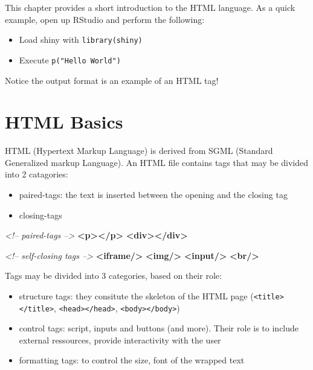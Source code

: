\documentclass[]{book}
\newenvironment{Shaded}{\begin{snugshade}}{\end{snugshade}}
\newcommand{\CommentTok}[1]{\textcolor[rgb]{0.56,0.35,0.01}{\textit{#1}}}
\newcommand{\KeywordTok}[1]{\textcolor[rgb]{0.13,0.29,0.53}{\textbf{#1}}}
\providecommand{\tightlist}{%
  \setlength{\itemsep}{0pt}\setlength{\parskip}{0pt}}
\begin{document}
This chapter provides a short introduction to the HTML language. As a quick example, open up RStudio and perform the following:

\begin{itemize}
\tightlist
\item
  Load shiny with \texttt{library(shiny)}
\item
  Execute \texttt{p("Hello\ World")}
\end{itemize}

Notice the output format is an example of an HTML tag!

\hypertarget{html-basics}{%
\section{HTML Basics}\label{html-basics}}

HTML (Hypertext Markup Language) is derived from SGML (Standard Generalized markup Language). An HTML file contains tags that may be divided into 2 catagories:

\begin{itemize}
\tightlist
\item
  paired-tags: the text is inserted between the opening and the closing tag
\item
  closing-tags
\end{itemize}

\begin{Shaded}
\begin{Highlighting}[]
\CommentTok{<!-- paired-tags -->}
\KeywordTok{<p></p>}
\KeywordTok{<div></div>}

\CommentTok{<!-- self-closing tags -->}
\KeywordTok{<iframe/>}
\KeywordTok{<img/>}
\KeywordTok{<input/>}
\KeywordTok{<br/>}
\end{Highlighting}
\end{Shaded}

Tags may be divided into 3 categories, based on their role:

\begin{itemize}
\tightlist
\item
  structure tags: they consitute the skeleton of the HTML page (\texttt{\textless{}title\textgreater{}\textless{}/title\textgreater{}}, \texttt{\textless{}head\textgreater{}\textless{}/head\textgreater{}}, \texttt{\textless{}body\textgreater{}\textless{}/body\textgreater{}})
\item
  control tags: script, inputs and buttons (and more). Their role is to include external ressources, provide interactivity with the user
\item
  formatting tags: to control the size, font of the wrapped text
\end{itemize}
\end{document}
